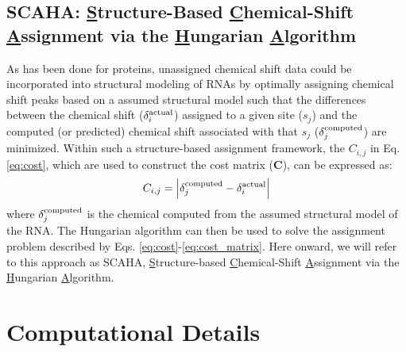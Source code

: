 \documentclass[journal=jcisd8,manuscript=article,layout=onecolumn]{achemso}
\begin{document}
\subsection{SCAHA: \underline{S}tructure-Based \underline{C}hemical-Shift \underline{A}ssignment via the \underline{H}ungarian \underline{A}lgorithm} As has been done for proteins\cite{meiler2003rapid, hart2008nmr, courtney2015experimental}, unassigned chemical shift data could be incorporated into structural modeling of RNAs by optimally assigning chemical shift peaks based on a assumed structural model such that the differences between the chemical shift  ($\delta_{i}^{\rm actual}$) assigned to a given site ($s_{j}$) and the computed (or predicted) chemical shift associated with that $s_{j}$ ($\delta_{j}^{\rm computed}$) are minimized.  Within such a structure-based assignment framework, the $C_{i,j}$  in  Eq. \ref{eq:cost}, which are used to construct the cost matrix (\textbf{C}), can be expressed as:
\begin{equation}\label{eq:cost_matrix} 
C_{i,j} =  \Big{|} \delta_{j}^{\rm computed} - \delta_{i}^{\rm actual}\Big{|}
\end{equation}
where $\delta_{j}^{\rm computed}$ is the chemical computed from the assumed structural model of the RNA. The Hungarian algorithm can then be used to solve the assignment problem described by Eqs.  \ref{eq:cost}-\ref{eq:cost_matrix}. Here onward, we will refer to this approach as SCAHA, \underline{S}tructure-based \underline{C}hemical-Shift \underline{A}ssignment via the \underline{H}ungarian \underline{A}lgorithm.

\section{Computational Details}
\label{sec:2}
\end{document}
